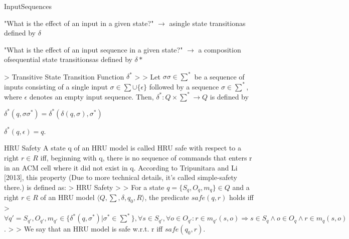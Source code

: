 \documentclass[a4paper]{article}
\begin{document}
\begin{multicols}{3}
    InputSequences
    \begin{itemize*}
        \item "What is the effect of an input in a given state?" $\rightarrow$  asingle state transitionas defined by $\delta$
        \item "What is the effect of an input sequence in a given state?" $\rightarrow$  a composition ofsequential state transitionsas defined by $\delta*$
    \end{itemize*}

    > Transitive State Transition Function $\delta^*$
    >
    > Let $\sigma\sigma\in\sum^*$ be a sequence of inputs consisting of a single input $\sigma\in\sum\cup\{\epsilon\}$ followed by a sequence $\sigma\in\sum^*$, where $\epsilon$ denotes an empty input sequence. Then, $\delta^*:Q\times\sum^*\rightarrow Q$ is defined by
    \begin{itemize*}
        \item $\delta^*(q,\sigma\sigma^*)=\delta^*(\delta(q,\sigma),\sigma^*)$
        \item $\delta^*(q,\epsilon)=q$.
    \end{itemize*}

    HRU Safety
    A state q of an HRU model is called HRU safe with respect to a right $r\in R$ iff, beginning with q, there is no sequence of commands that enters r in an ACM cell where it did not exist in q.
    According to Tripunitara and Li [2013], this property (Due to more technical details, it’s called simple-safety there.) is defined as:
    > HRU Safety
    >
    > For a state $q=\{S_q,O_q,m_q\}\in Q$ and a right $r\in R$ of an HRU model $⟨Q,\sum,\delta,q_0,R⟩$, the predicate $safe(q,r)$ holds iff
    > $\forall q'= S_{q'},O_{q'},m_{q'} \in \{\delta^*(q,\sigma^*)|\sigma^*\in\sum^*\},\forall s\in S_{q'},\forall o\in O_{q'}: r\in m_{q'}(s,o)\Rightarrow s\in S_q \wedge o\in O_q \wedge r\in m_q(s,o)$.
    >
    > We say that an HRU model is safe w.r.t. r iff $safe(q_0 ,r)$.


\end{multicols}
\end{document}
